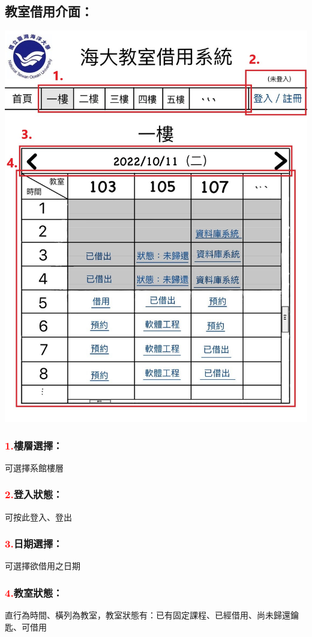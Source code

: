 \documentclass{article}
\begin{document}
\subsection*{教室借用介面：}
\medskip
\begin{minipage}{0.6\linewidth}
	\includegraphics[height=0.4\textheight]{Borowing_GUI.jpg}
\end{minipage}
\begin{minipage}{0.4\linewidth}
	\subsubsection*{\textcolor{red}{1.}樓層選擇：}可選擇系館樓層
	\subsubsection*{\textcolor{red}{2.}登入狀態：}可按此登入、登出
	\subsubsection*{\textcolor{red}{3.}日期選擇：}可選擇欲借用之日期
	\subsubsection*{\textcolor{red}{4.}教室狀態：}直行為時間、橫列為教室，教室狀態有：已有固定課程、已經借用、尚未歸還鑰匙、可借用
\end{minipage}
\end{document}
